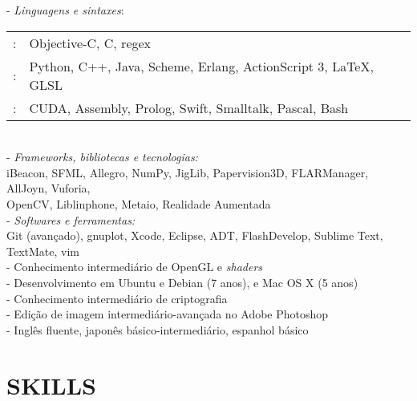 \documentclass[]{res} %
\def \divspace{6pt}
\begin{document}
\begin{resume}
    - {\sl Linguagens e sintaxes}: \\
    \setlength\tabcolsep{2pt}
    \begin{tabular}{r l}
    \hspace*{1.5em}{\sl Fluente}:& Objective-C, C, regex \\
    \hspace*{1.5em}{\sl Muito Familiar}:& Python, C++, Java, Scheme, Erlang, ActionScript 3, \LaTeX, GLSL \\
    \hspace*{1.5em}{\sl Pouco Familiar}:& CUDA, Assembly, Prolog, Swift, Smalltalk, Pascal, Bash \\
    \end{tabular}
    \\
    - {\sl Frameworks, bibliotecas e tecnologias:} \\
    \hspace*{1.5em}iBeacon, SFML, Allegro, NumPy, JigLib, Papervision3D, FLARManager, AllJoyn, Vuforia, \\
    \hspace*{1.5em}OpenCV, Liblinphone, Metaio, Realidade Aumentada
    \\
    - {\sl Softwares e ferramentas:} \\
    \hspace*{1.5em}Git (avançado), gnuplot, Xcode, Eclipse, ADT, FlashDevelop, Sublime Text, TextMate, vim
    \\
    - Conhecimento intermediário de OpenGL e {\it shaders} \\
    - Desenvolvimento em Ubuntu e Debian (7 anos), e Mac OS X (5 anos) \\
    - Conhecimento intermediário de criptografia \\
    - Edição de imagem intermediário-avançada no Adobe Photoshop \\
    - Inglês fluente, japonês básico-intermediário, espanhol básico
\else
    \section{SKILLS \hspace{\divspace} }


\end{resume}
\end{document}
